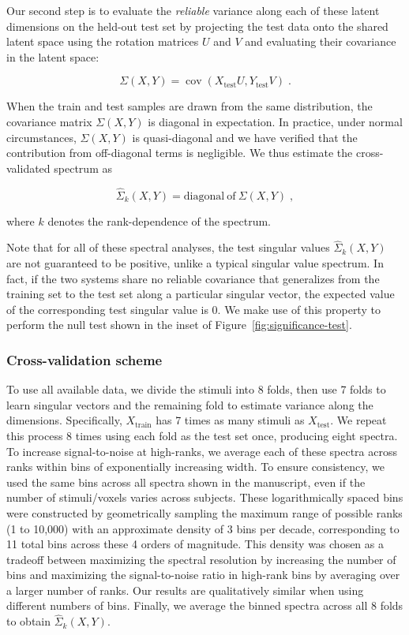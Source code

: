 \documentclass[10pt]{article}
\begin{document}
Our second step is to evaluate the \emph{reliable} variance along each of these latent dimensions on the held-out test set by projecting the test data onto the shared latent space using the rotation matrices \(U\) and \(V\) and evaluating their covariance in the latent space:

\[
\Sigma(X, Y) = \operatorname{cov}
\left(X_\text{test}U, Y_\text{test} V \right)\;.
\]

When the train and test samples are drawn from the same distribution, the covariance matrix \(\Sigma(X, Y)\) is diagonal in expectation. In practice, under normal circumstances, \(\Sigma(X, Y)\) is quasi-diagonal and we have verified that the contribution from off-diagonal terms is negligible. We thus estimate the cross-validated spectrum as

\[
\hat{\Sigma}_k(X, Y) = \mathrm{diagonal~of~}\Sigma(X, Y)\;,
\]

where \(k\) denotes the rank-dependence of the spectrum.

Note that for all of these spectral analyses, the test singular values \(\hat{\Sigma}_k(X, Y)\) are not guaranteed to be positive, unlike a typical singular value spectrum. In fact, if the two systems share no reliable covariance that generalizes from the training set to the test set along a particular singular vector, the expected value of the corresponding test singular value is 0. We make use of this property to perform the null test shown in the inset of Figure~\ref{fig:significance-test}.

\subsubsection{Cross-validation scheme}\label{cross-validation-scheme}

To use all available data, we divide the stimuli into 8 folds, then use 7 folds to learn singular vectors and the remaining fold to estimate variance along the dimensions. Specifically, \(X_\text{train}\) has 7 times as many stimuli as \(X_\text{test}\). We repeat this process 8 times using each fold as the test set once, producing eight spectra. To increase signal-to-noise at high-ranks, we average each of these spectra across ranks within bins of exponentially increasing width. To ensure consistency, we used the same bins across all spectra shown in the manuscript, even if the number of stimuli/voxels varies across subjects. These logarithmically spaced bins were constructed by geometrically sampling the maximum range of possible ranks (1 to 10,000) with an approximate density of 3 bins per decade, corresponding to 11 total bins across these 4 orders of magnitude. This density was chosen as a tradeoff between maximizing the spectral resolution by increasing the number of bins and maximizing the signal-to-noise ratio in high-rank bins by averaging over a larger number of ranks. Our results are qualitatively similar when using different numbers of bins. Finally, we average the binned spectra across all 8 folds to obtain \(\hat{\Sigma}_k(X, Y)\).
\end{document}
